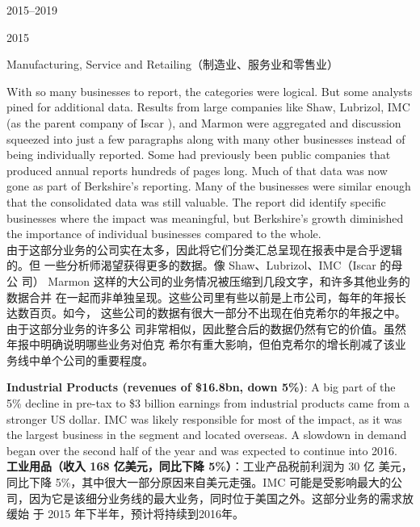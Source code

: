 \begin{chapter}{2015--2019}
\begin{section}{2015}
\begin{subsection}{Manufacturing, Service and Retailing（制造业、服务业和零售业）}
\begin{verseparallel}
  {
    With so many businesses to report, the categories were logical. But some
    analysts pined for additional data. Results from large companies like Shaw,
    Lubrizol, IMC (as the parent company of Iscar ), and Marmon
    were aggregated and discussion squeezed into just a few paragraphs along
    with many other businesses instead of being individually reported. Some had
    previously been public companies that produced annual reports hundreds of
    pages long. Much of that data was now gone as part of Berkshire’s
    reporting. Many of the businesses were similar enough that the consolidated
    data was still valuable. The report did identify specific businesses where
    the impact was meaningful, but Berkshire’s growth diminished the importance
    of individual businesses compared to the whole. \\
  }
  {
    由于这部分业务的公司实在太多，因此将它们分类汇总呈现在报表中是合乎逻辑的。但
    一些分析师渴望获得更多的数据。像 Shaw、Lubrizol、IMC（Iscar 的母公
    司） Marmon 这样的大公司的业务情况被压缩到几段文字，和许多其他业务的数据合并
    在一起而非单独呈现。这些公司里有些以前是上市公司，每年的年报长达数百页。如今，
    这些公司的数据有很大一部分不出现在伯克希尔的年报之中。由于这部分业务的许多公
    司非常相似，因此整合后的数据仍然有它的价值。虽然年报中明确说明哪些业务对伯克
    希尔有重大影响，但伯克希尔的增长削减了该业务线中单个公司的重要程度。
  }
\end{verseparallel}

\begin{verseparallel}
  {
    \textbf{Industrial Products (revenues of \$16.8bn, down 5\%)}: A big part of the 5\%
    decline in pre-tax to \$3 billion earnings from industrial products came
    from a stronger US dollar. IMC was likely responsible for most of the
    impact, as it was the largest business in the segment and located overseas.
    A slowdown in demand began over the second half of the year and was expected
    to continue into 2016. \\
  }
  {
    \textbf{工业用品（收入 168 亿美元，同比下降 5\%）}：工业产品税前利润为 30 亿
    美元，同比下降 5\%，其中很大一部分原因来自美元走强。IMC 可能是受影响最大的公
    司，因为它是该细分业务线的最大业务，同时位于美国之外。这部分业务的需求放缓始
    于 2015 年下半年，预计将持续到2016年。
  }
\end{verseparallel}


\end{subsection}
\end{section}
\end{chapter}
